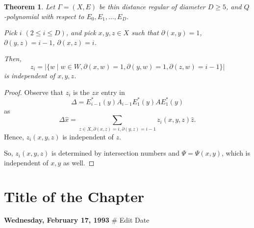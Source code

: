 \documentclass[
]{book}
\newtheorem{theorem}{Theorem}[chapter]
\theoremstyle{definition}
\theoremstyle{definition}
\theoremstyle{definition}
\theoremstyle{definition}
\theoremstyle{remark}
\begin{document}
\begin{theorem}
\protect\hypertarget{thm:zi}{}\label{thm:zi}Let \(\Gamma = (X, E)\) be thin distance regular of diameter \(D\geq 5\), and \(Q\)-polynomial with respect to \(E_0, E_1, \ldots, E_D\).

Pick \(i\) \((2\leq i\leq D)\), and pick \(x, y, z\in X\) such that \(\partial(x,y) =1\), \(\partial(y,z) = i-1\), \(\partial(x,z) = i\).

Then,
\[z_i = |\{w\mid w\in W, \partial(x,w) =1, \partial(y,w)=1, \partial(z,w)=i-1\}|\]
is independent of \(x, y, z\).
\end{theorem}

\begin{proof}
Observe that \(z_i\) is the \(zx\) entry in
\[\Delta = E^*_{i-1}(y)A_{i-1}E^*_1(y)AE^*_1(y)\]
as
\[\Delta \hat{x} = \sum_{z\in X, \partial(x,z)=i, \partial(y,z)=i-1}z_i(x,y,z)\hat{z}.\]
Hence, \(z_i(x,y,z)\) is independent of \(z\).

So, \(z_i(x,y,z)\) is determined by intersection numbers and \(\Psi = \Psi(x,y)\), which is independent of \(x, y\) as well.
\end{proof}

\hypertarget{lec55}{%
\chapter{Title of the Chapter}\label{lec55}}

\textbf{Wednesday, February 17, 1993} \# Edit Date

  

\printindex
\end{document}
